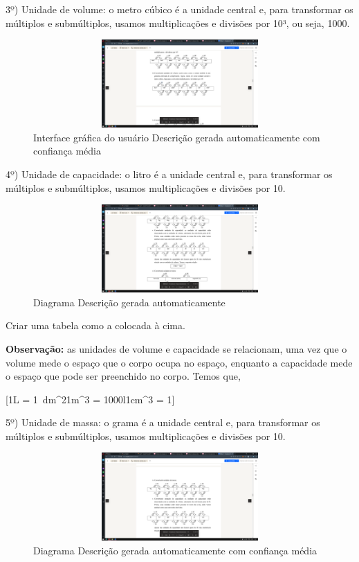 3º) {Unidade de volume}: o metro cúbico é a unidade central e, para
transformar os múltiplos e submúltiplos, usamos multiplicações e
divisões por 10³, ou seja, 1000.

\begin{figure}
\centering
\includegraphics[width=4.79026in,height=1.32283in]{./imgSAEB_7_MAT/media/image79.png}
\caption{Interface gráfica do usuário Descrição gerada automaticamente
com confiança média}
\end{figure}


4º) {Unidade de capacidade:} o litro é a unidade central e, para
transformar os múltiplos e submúltiplos, usamos multiplicações e
divisões por 10.

\begin{figure}
\centering
\includegraphics[width=5.22733in,height=1.32283in]{./imgSAEB_7_MAT/media/image80.png}
\caption{Diagrama Descrição gerada automaticamente}
\end{figure}

Criar uma tabela como a colocada à cima.

\textbf{Observação:} as unidades de volume e capacidade se relacionam,
uma vez que o volume mede o espaço que o corpo ocupa no espaço, enquanto
a capacidade mede o espaço que pode ser preenchido no corpo. Temos que,

[1L = 1\ dm^{2}1m^{3} = 1000l1cm^{3} = 1]

5º) {Unidade de massa:} o grama é a unidade central e, para transformar
os múltiplos e submúltiplos, usamos multiplicações e divisões por 10.

\begin{figure}
\centering
\includegraphics[width=5.71654in,height=1.32283in]{./imgSAEB_7_MAT/media/image81.png}
\caption{Diagrama Descrição gerada automaticamente com confiança média}
\end{figure}

